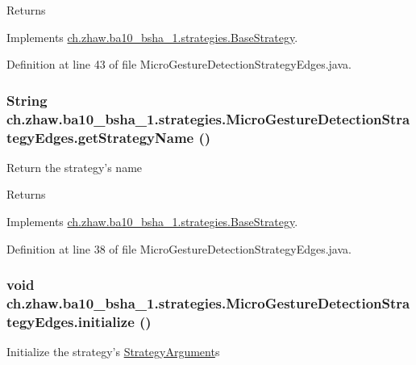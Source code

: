 \begin{DoxyReturn}{Returns}

\end{DoxyReturn}


Implements \hyperlink{classch_1_1zhaw_1_1ba10__bsha__1_1_1strategies_1_1BaseStrategy_a75fdb36932ad701f6375cc1fe718056b}{ch.zhaw.ba10\_\-bsha\_\-1.strategies.BaseStrategy}.

Definition at line 43 of file MicroGestureDetectionStrategyEdges.java.\hypertarget{classch_1_1zhaw_1_1ba10__bsha__1_1_1strategies_1_1MicroGestureDetectionStrategyEdges_a7ae8347737b8180278eb34f6d5cbba1d}{
\subsubsection[{getStrategyName}]{\setlength{\rightskip}{0pt plus 5cm}String ch.zhaw.ba10\_\-bsha\_\-1.strategies.MicroGestureDetectionStrategyEdges.getStrategyName ()}}
\label{classch_1_1zhaw_1_1ba10__bsha__1_1_1strategies_1_1MicroGestureDetectionStrategyEdges_a7ae8347737b8180278eb34f6d5cbba1d}
Return the strategy's name

\begin{DoxyReturn}{Returns}

\end{DoxyReturn}


Implements \hyperlink{classch_1_1zhaw_1_1ba10__bsha__1_1_1strategies_1_1BaseStrategy_aa0ebed55eed45409bad13d43a0058780}{ch.zhaw.ba10\_\-bsha\_\-1.strategies.BaseStrategy}.

Definition at line 38 of file MicroGestureDetectionStrategyEdges.java.\hypertarget{classch_1_1zhaw_1_1ba10__bsha__1_1_1strategies_1_1MicroGestureDetectionStrategyEdges_ab4abee912f5692af0155d1770c354108}{
\subsubsection[{initialize}]{\setlength{\rightskip}{0pt plus 5cm}void ch.zhaw.ba10\_\-bsha\_\-1.strategies.MicroGestureDetectionStrategyEdges.initialize ()}}
\label{classch_1_1zhaw_1_1ba10__bsha__1_1_1strategies_1_1MicroGestureDetectionStrategyEdges_ab4abee912f5692af0155d1770c354108}
Initialize the strategy's \hyperlink{classch_1_1zhaw_1_1ba10__bsha__1_1_1StrategyArgument}{StrategyArgument}s 


